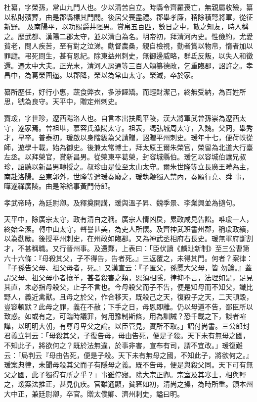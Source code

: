 \begin{pinyinscope}
 杜纂，字榮孫，常山九門人也。少以清苦自立。時縣令齊羅喪亡，無親屬收殮，纂以私財殯葬，由是郡縣標其門閭。後居父喪盡禮。郡舉孝廉，稍除積弩將軍，從征新野。
 及南陽平，以功賜爵井陘男。賞帛五百匹，數日之中，散之知友，時人稱之。歷武都、漢陽二郡太守，並以清白為名。明帝初，拜清河內史。性儉約，尤愛貧老，問人疾苦，至有對之泣涕。勸督農桑，親自檢視，勤者賞以物帛，惰者加以罪譴。弔死問生，甚有恩紀。除東益州刺史，無御邊威略，群氐反叛，以失人和徵還。遷太中大夫。正光末，清河人房通等三百人頌纂德政，乞重臨郡，詔許之。孝昌中，為葛榮圍逼。以郡降，榮以為常山太守。榮滅，卒於家。



 纂所歷任，好行小惠，蔬食弊衣，多涉誣矯。而輕財潔己，終無受納，為百姓所思，號為良守。天平中，贈定州刺史。



 竇瑗，字世珍，遼西陽洛人也。自言本出扶風平陵，漢大將軍武曾孫崇為遼西太守，遂家焉。曾祖堪，慕容氏漁陽太守。祖表，馮弘城周太守，入魏。父冏，舉秀才，早卒。普泰初，瑗啟以身階級為父請贈，詔贈平州刺史。瑗年十七，便荷帙從師，遊學十載，始為御史。後兼太常博士，拜太原王爾朱榮官，榮留為北道大行臺左丞。以拜榮官，賞新昌男。從榮東平葛榮，封容城縣伯。瑗乞以容城伯讓兄叔珍，詔聽以新昌男轉授之。叔珍由是位至太山太守。爾朱世隆等立長廣王曄為主，南赴洛陽。至東郭外，世隆等遣瑗奏廢之，瑗執鞭獨入禁內，奏願行堯、舜
 事，曄遂禪廣陵。由是除給事黃門侍郎。



 孝武帝時，為廷尉卿。及釋奠開講，瑗與溫子昇、魏季景、李業興並為擿句。



 天平中，除廣宗太守，政有清白之稱。廣宗人情凶戾，累政咸見告訟。唯瑗一人，終始全潔。轉中山太守，聲譽甚美，為吏人所懷。及齊神武班書州郡，稱瑗政績，以為勸勵。後授平州刺史，在州政如臨郡。又為神武丞相府右長史。瑗無軍府斷割才，不甚稱職。又行晉州事。及還鄴，上表曰：「臣伏讀《麟趾新制》至三公曹第六十六條：『母殺其父，子不得告，告者死。』三返覆之，未得其門。何者？案律：『子孫告父母、祖父母者，死。』又漢宣云：『子匿父，孫慝大父母，皆
 勿論。』蓋謂父母、祖父母小者攘羊，甚者殺害之類，恩須相隱，律抑不言，法理如是，足見其直，未必指母殺父，止子不言也。今母殺父而子不告，便是知母而不知父，識比野人，義近禽獸。且母之於父，作合移天，既殺己之天，復殺子之天，二天頓毀，豈容頓默？此母之罪，義在不赦；下手之日，母恩即離。仍以母道不告，鄙臣所以致惑。如或有之，可臨時議罪，何用豫制斯條，用為訓誡？恐千載之下，談者喧譁，以明明大朝，有尊母卑父之論。以臣管見，實所不取。」詔付尚書。三公郎封君義立判云：「母殺其父，子復告母，母由告死，便是子殺。天下未有無母之國，
 不知此子，將欲何之？既於法無違，於事非害，宣布有司，謂不宜改。」瑗復難云：「局判云『母由告死，便是子殺。天下未有無母之國，不知此子，將欲何之。』瑗案典律，未聞母殺其父而子有隱母之義。既不告母，便是與殺父同。天下可有無父之國，此子獨得有所之乎？」事雖停寢。除大宗正卿。宗室及其寒士，相與輕之，瑗案法推正，甚見仇疾。官雖通顯，貧窘如初，清尚之操，為時所重。領本州大中正，兼廷尉卿，卒官。贈太僕卿、濟州刺史，謚曰明。




\end{pinyinscope}
